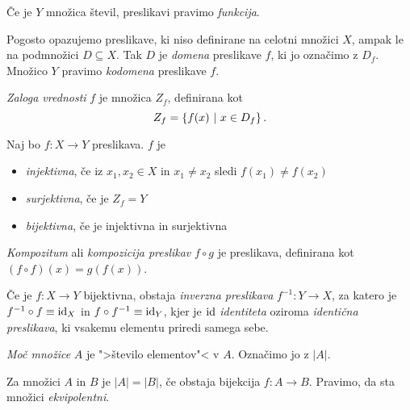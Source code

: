 \documentclass[12pt, a4paper]{article}
\begin{document}
\begin{definicija}
Če je $Y$ množica števil, preslikavi pravimo \emph{funkcija}.
\end{definicija}

Pogosto opazujemo preslikave, ki niso definirane na celotni množici $X$, ampak le na podmnožici $D\subseteq X$. Tak $D$ je \emph{domena} preslikave $f$, ki jo označimo z $D_f$. Množico $Y$ pravimo \emph{kodomena} preslikave $f$.

\begin{definicija}
\emph{Zaloga vrednosti} $f$ je množica $Z_f$, definirana kot
\[
Z_f=\left\{f(x)~\middle\vert~x\in D_f\right\}.
\]
\end{definicija}

\begin{definicija}
Naj bo $f\colon X\to Y$ preslikava. $f$ je

\begin{itemize}
\item \emph{injektivna}, če iz $x_1,x_2\in X$ in $x_1\ne x_2$ sledi $f(x_1)\ne f(x_2)$
\item \emph{surjektivna}, če je $Z_f=Y$
\item \emph{bijektivna}, če je injektivna in surjektivna
\end{itemize}
\end{definicija}

\begin{definicija}
\emph{Kompozitum} ali \emph{kompozicija preslikav} $f\circ g$ je preslikava, definirana kot $(f\circ f)(x)=g(f(x))$.
\end{definicija}

\begin{definicija}
Če je $f\colon X\to Y$ bijektivna, obstaja \emph{inverzna preslikava} $f^{-1}\colon Y\to X$, za katero je $f^{-1}\circ f\equiv \operatorname{id}_X$ in $f\circ f^{-1}\equiv \operatorname{id}_Y$, kjer je $\operatorname{id}$ \emph{identiteta} oziroma \emph{identična preslikava}, ki vsakemu elementu priredi samega sebe.
\end{definicija}

\begin{definicija}
\emph{Moč množice} $A$ je ">število elementov"< v $A$. Označimo jo z $|A|$.
\end{definicija}

\begin{definicija}
Za množici $A$ in $B$ je $|A|=|B|$, če obstaja bijekcija $f\colon A\to B$. Pravimo, da sta množici \emph{ekvipolentni}.
\end{definicija}
\end{document}
